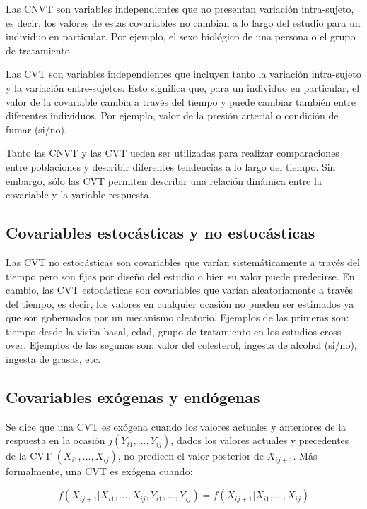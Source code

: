 \documentclass[12pt]{article}
\begin{document}
Las CNVT son variables independientes que no presentan variación intra-sujeto, es decir, los valores de estas covariables
no cambian a lo largo del estudio para un individuo en particular. Por ejemplo, el sexo biológico de una persona o el
grupo de tratamiento.

Las CVT son variables independientes que incluyen tanto la variación intra-sujeto y la variación entre-sujetos. Esto
significa que, para un individuo en particular, el valor de la covariable cambia a través del tiempo y puede cambiar
también entre diferentes individuos. Por ejemplo, valor de la presión arterial o condición de fumar (si/no).

Tanto las CNVT y las CVT ueden ser utilizadas para realizar comparaciones entre poblaciones y describir diferentes
tendencias a lo largo del tiempo. Sin embargo, sólo las CVT permiten describir una relación dinámica entre la covariable
y la variable respuesta.

\subsection{Covariables estocásticas y no estocásticas}

Las CVT no estocásticas son covariables que varían sistemáticamente a través del tiempo pero son fijas por diseño del
estudio o bien su valor puede predecirse. En cambio, las CVT estocásticas son covariables que varían aleatoriamente a
través del tiempo, es decir, los valores en cualquier ocasión no pueden ser estimados ya que son gobernados por un
mecanismo aleatorio. Ejemplos de las primeras son: tiempo desde la visita basal, edad, grupo de tratamiento en los
estudios cross-over. Ejemplos de las segunas son: valor del colesterol, ingesta de alcohol (si/no), ingesta de grasas, etc.

\subsection{Covariables exógenas y endógenas}

Se dice que una CVT es exógena cuando los valores actuales y anteriores de la respuesta en la ocasión
$j (Y_{i1}, ..., Y_{ij})$, dados los valores actuales y precedentes de la CVT $(X_{i1}, ..., X_{ij})$, no predicen el
valor posterior de $X_{ij+1}$. Más formalmente, una CVT es exógena cuando:

\begin{equation}
	\label{exogeneidad}
	f(X_{ij+1}|X_{i1}, ..., X_{ij}, Y_{i1}, ..., Y_{ij}) = f(X_{ij+1}|X_{i1}, ..., X_{ij})
\end{equation}
\end{document}
